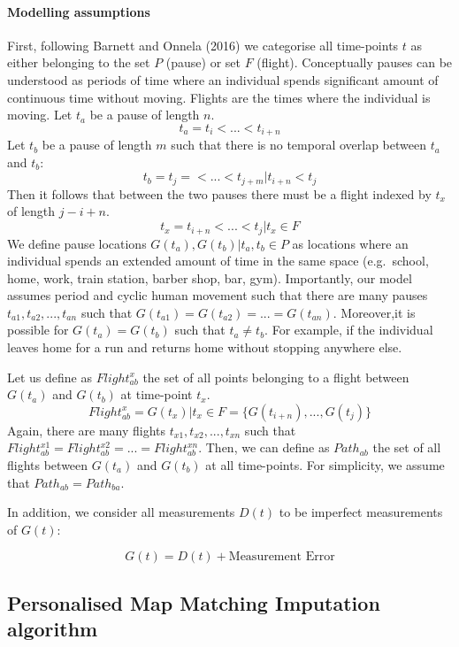 \documentclass[man]{apa6}
\theoremstyle{definition}
\theoremstyle{definition}
\theoremstyle{definition}
\theoremstyle{remark}
\begin{document}
\paragraph{Modelling assumptions}\label{modelling-assumptions}

First, following Barnett and Onnela (2016) we categorise all time-points
\(t\) as either belonging to the set \(P\) (pause) or set \(F\)
(flight). Conceptually pauses can be understood as periods of time where
an individual spends significant amount of continuous time without
moving. Flights are the times where the individual is moving. Let
\(t_a\) be a pause of length \(n\). \[t_a = t_i < ... < t_{i+n}\] Let
\(t_b\) be a pause of length \(m\) such that there is no temporal
overlap between \(t_a\) and \(t_b\):
\[t_b = t_j= < ... < t_{j+m}|t_{i+n}< t_j\] Then it follows that between
the two pauses there must be a flight indexed by \(t_x\) of length
\(j-i+n\). \[t_x =  t_{i+n} < ... < t_{j} |t_x \in F\] We define pause
locations \(G(t_a), G(t_b) | t_a, t_b \in P\) as locations where an
individual spends an extended amount of time in the same space
(e.g.~school, home, work, train station, barber shop, bar, gym).
Importantly, our model assumes period and cyclic human movement such
that there are many pauses \(t_{a1},t_{a2},...,t_{an}\) such that
\(G(t_{a1}) = G(t_{a2}) = ... = G(t_{an})\). Moreover,it is possible for
\(G(t_a) = G(t_b)\) such that \(t_a \ne t_b\). For example, if the
individual leaves home for a run and returns home without stopping
anywhere else.

Let us define as \(Flight^x_{ab}\) the set of all points belonging to a
flight between \(G(t_a)\) and \(G(t_b)\) at time-point \(t_x\).
\[Flight^x_{ab}= G(t_x)|t_x \in F =  \{G(t_{i+n}),...,G(t_j)\}\] Again,
there are many flights \(t_{x1},t_{x2},...,t_{xn}\) such that
\(Flight^{x1}_{ab} = Flight^{x2}_{ab} = ... = Flight^{xn}_{ab}\). Then,
we can define as \(Path_{ab}\) the set of all flights between \(G(t_a)\)
and \(G(t_b)\) at all time-points. For simplicity, we assume that
\(Path_{ab}=Path_{ba}\).

In addition, we consider all measurements \(D(t)\) to be imperfect
measurements of \(G(t)\):

\[ G(t) = D(t) + \text{Measurement Error}  \]

\subsection{Personalised Map Matching Imputation
algorithm}\label{personalised-map-matching-imputation-algorithm}
\end{document}

